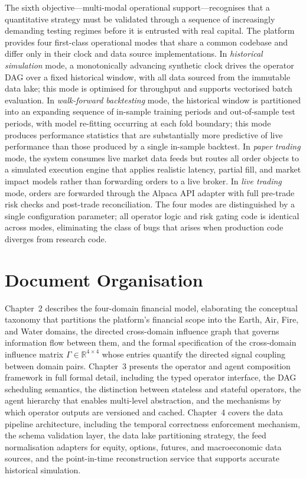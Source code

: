 \documentclass[12pt,openany]{book}
\numberwithin{equation}{chapter}
\theoremstyle{plain}
\theoremstyle{definition}
\theoremstyle{remark}
\begin{document}
The sixth objective—multi-modal operational support—recognises that a quantitative strategy must be validated through a sequence of increasingly demanding testing regimes before it is entrusted with real capital. The platform provides four first-class operational modes that share a common codebase and differ only in their clock and data source implementations. In \emph{historical simulation} mode, a monotonically advancing synthetic clock drives the operator DAG over a fixed historical window, with all data sourced from the immutable data lake; this mode is optimised for throughput and supports vectorised batch evaluation. In \emph{walk-forward backtesting} mode, the historical window is partitioned into an expanding sequence of in-sample training periods and out-of-sample test periods, with model re-fitting occurring at each fold boundary; this mode produces performance statistics that are substantially more predictive of live performance than those produced by a single in-sample backtest. In \emph{paper trading} mode, the system consumes live market data feeds but routes all order objects to a simulated execution engine that applies realistic latency, partial fill, and market impact models rather than forwarding orders to a live broker. In \emph{live trading} mode, orders are forwarded through the Alpaca API adapter with full pre-trade risk checks and post-trade reconciliation. The four modes are distinguished by a single configuration parameter; all operator logic and risk gating code is identical across modes, eliminating the class of bugs that arises when production code diverges from research code.

\section{Document Organisation}

Chapter~2 describes the four-domain financial model, elaborating the conceptual taxonomy that partitions the platform's financial scope into the Earth, Air, Fire, and Water domains, the directed cross-domain influence graph that governs information flow between them, and the formal specification of the cross-domain influence matrix $\Gamma \in \mathbb{R}^{4 \times 4}$ whose entries quantify the directed signal coupling between domain pairs. Chapter~3 presents the operator and agent composition framework in full formal detail, including the typed operator interface, the DAG scheduling semantics, the distinction between stateless and stateful operators, the agent hierarchy that enables multi-level abstraction, and the mechanisms by which operator outputs are versioned and cached. Chapter~4 covers the data pipeline architecture, including the temporal correctness enforcement mechanism, the schema validation layer, the data lake partitioning strategy, the feed normalisation adapters for equity, options, futures, and macroeconomic data sources, and the point-in-time reconstruction service that supports accurate historical simulation.
\end{document}
